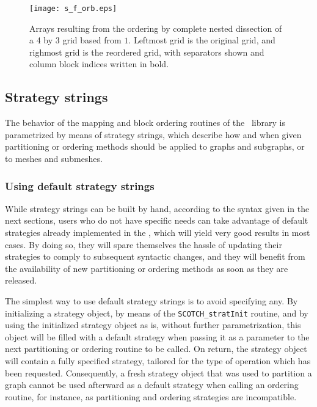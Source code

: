 \begin{figure}
\centering\texttt{[image: s\_f\_orb.eps]}
\caption{Arrays resulting from the ordering by complete nested
dissection of a 4 by 3 grid based from $1$. Leftmost grid is the
original grid, and righmost grid is the reordered grid, with
separators shown and column block indices written in bold.}
\label{fig-lib-ord-block}
\end{figure}

\subsection{Strategy strings}

The behavior of the mapping and block ordering routines of the
\libscotch\ library is parametrized by means of strategy strings,
which describe how and when given partitioning or ordering methods
should be applied to graphs and subgraphs, or to meshes and submeshes.

\subsubsection{Using default strategy strings}
\label{sec-lib-format-strat-default}

While strategy strings can be built by hand, according to the syntax
given in the next sections, users who do not have specific needs can
take advantage of default strategies already implemented in the
\libscotch, which will yield very good results in most cases. By
doing so, they will spare themselves the hassle of updating their
strategies to comply to subsequent syntactic changes, and they will
benefit from the availability of new partitioning or ordering methods
as soon as they are released.

The simplest way to use default strategy strings is to avoid
specifying any. By initializing a strategy object, by means of the
{\tt SCOTCH\_\lbt stratInit} routine, and by using the initialized
strategy object as is, without further parametrization, this object
will be filled with a default strategy when passing it as a parameter
to the next partitioning or ordering routine to be called. On return,
the strategy object will contain a fully specified strategy, tailored
for the type of operation which has been requested. Consequently, a
fresh strategy object that was used to partition a graph cannot be
used afterward as a default strategy when calling an ordering routine,
for instance, as partitioning and ordering strategies are incompatible.

